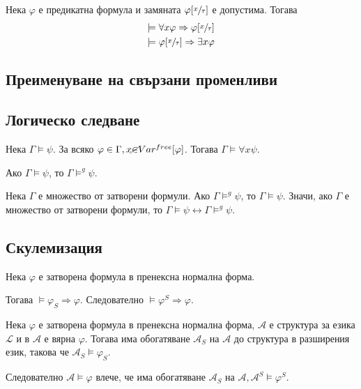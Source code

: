 \documentclass{article}
\begin{document}
\begin{claim}
Нека $\varphi$ е предикатна формула и замяната $\varphi[\sfrac{x}{\tau}]$ е допустима. Тогава
\begin{align*}
  \models \forall x\varphi \Rightarrow \varphi[\sfrac{x}{\tau}]\\ 
  \models \varphi[\sfrac{x}{\tau}] \Rightarrow \exists x \varphi\\ 
\end{align*}
\end{claim}


\subsection*{Преименуване на свързани променливи}

\subsection*{Логическо следване}

\begin{claim}
Нека $\Gamma \models \psi$. За всяко $\varphi \in \Gamma, x \cancel{\in} Var^{free}[\varphi]$. Тогава $\Gamma \models \forall x \psi$.
\end{claim}

\begin{claim}
Ако $\Gamma \models \psi$, то $\Gamma \models^g \psi$.
\end{claim}

\begin{claim}
Нека $\Gamma$ е множество от затворени формули. Ако $\Gamma \models^g \psi$, то $\Gamma \models \psi$. Значи, ако $\Gamma$ е множество от затворени формули, то $\Gamma \models \psi \longleftrightarrow \Gamma \models^g \psi$.
\end{claim}

\subsection*{Скулемизация}

\begin{claim}
Нека $\varphi$ е затворена формула в пренексна нормална форма. 

Тогава $\models \varphi_S \Rightarrow \varphi$. Следователно $\models \varphi^S \Rightarrow \varphi$.
\end{claim}

\begin{claim}
Нека $\varphi$ е затворена формула в пренексна нормална форма, $\mathcal{A}$ е структура за езика $\mathcal{L}$ и в $\mathcal{A}$ е вярна $\varphi$. Тогава има обогатяване $\mathcal{A}_S$ на $\mathcal{A}$ до структура в разширения език, такова че $\mathcal{A}_S \models \varphi_S$.

Следователно $\mathcal{A} \models \varphi$ влече, че има обогатяване $\mathcal{A}_S$ на $\mathcal{A}, \mathcal{A}^S \models \varphi^S$.
\end{claim}
\end{document}
